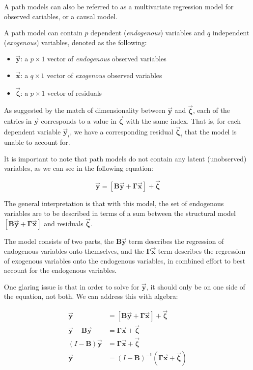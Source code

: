\documentclass{article}
\begin{document}
\begin{multicols*}{2}
A path models can also be referred to as a multivariate regression model for observed cariables, or a causal model.

A path model can contain $p$ dependent (\textit{endogenous}) variables and $q$ independent (\textit{exogenous}) variables, denoted as the following:

\begin{itemize}
    \item $\mathbf{\vec{y}}$: a $p \times 1$ vector of \textit{endogenous} observed variables
    \item $\mathbf{\vec{x}}$: a $q \times 1$ vector of \textit{exogenous} observed variables
    \item $\mathbf{\vec{\zeta}}$: a $p \times 1$ vector of residuals
\end{itemize}

As suggested by the match of dimensionality between $\mathbf{\vec{y}}$ and $\mathbf{\vec{\zeta}}$, each of the entries in $\mathbf{\vec{y}}$ corresponds to a value in $\mathbf{\vec{\zeta}}$ with the same index. That is, for each dependent variable $\mathbf{\vec{y}}_i$, we have a corresponding residual $\mathbf{\vec{\zeta}}_i$ that the model is unable to account for.

It is important to note that path models do not contain any latent (unobserved) variables, as we can see in the following equation: 

\[\mathbf{\vec{y}} = [\mathbf{B} \mathbf{\vec{y}} + \mathbf{\Gamma} \mathbf{\vec{x}}] + \mathbf{\vec{\zeta}}\]

The general interpretation is that with this model, the set of endogenous variables are to be described in terms of a sum between the structural model $[\mathbf{B} \mathbf{\vec{y}} + \mathbf{\Gamma} \mathbf{\vec{x}}]$ and residuals $\mathbf{\vec{\zeta}}$.

The model consists of two parts, the $\mathbf{B} \mathbf{\vec{y}}$ term describes the regression of endogenous variables onto themselves, and the $\mathbf{\Gamma} \mathbf{\vec{x}}$ term describes the regression of exogenous variables onto the endogenous variables, in combined effort to best account for the endogenous variables.

One glaring issue is that in order to solve for $\mathbf{\vec{y}}$, it should only be on one side of the equation, not both. We can address this with algebra:

\[
\begin{aligned}
    \mathbf{\vec{y}} &= [\mathbf{B} \mathbf{\vec{y}} + \mathbf{\Gamma} \mathbf{\vec{x}}] + \mathbf{\vec{\zeta}} \\
    \mathbf{\vec{y}} - \mathbf{B} \mathbf{\vec{y}} &= \mathbf{\Gamma} \mathbf{\vec{x}} + \mathbf{\vec{\zeta}} \\
    (I - \mathbf{B}) \mathbf{\vec{y}} &= \mathbf{\Gamma} \mathbf{\vec{x}} + \mathbf{\vec{\zeta}} \\
    \mathbf{\vec{y}} &= (I - \mathbf{B})^{-1}(\mathbf{\Gamma} \mathbf{\vec{x}} + \mathbf{\vec{\zeta}}) \\
\end{aligned}    
\]


\end{multicols*}
\end{document}
